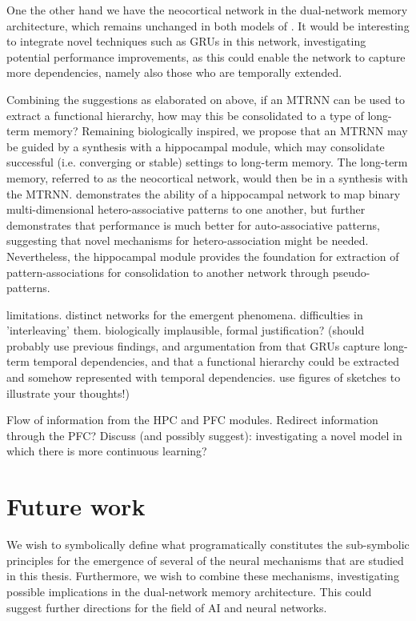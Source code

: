 One the other hand we have the neocortical network in the dual-network memory architecture, which remains unchanged in both models of \cite{Hattori2010, Hattori2014}. It would be interesting to integrate novel techniques such as GRUs in this network, investigating potential performance improvements, as this could enable the network to capture more dependencies, namely also those who are temporally extended.

Combining the suggestions as elaborated on above, if an MTRNN can be used to extract a functional hierarchy, how may this be consolidated to a type of long-term memory? Remaining biologically inspired, we propose that an MTRNN may be guided by a synthesis with a hippocampal module, which may consolidate successful (i.e. converging or stable) settings to long-term memory. The long-term memory, referred to as the neocortical network, would then be in a synthesis with the MTRNN.
\cite{Hattori2014} demonstrates the ability of a hippocampal network to map binary multi-dimensional hetero-associative patterns to one another, but further demonstrates that performance is much better for auto-associative patterns, suggesting that novel mechanisms for hetero-association might be needed. Nevertheless, the hippocampal module provides the foundation for extraction of pattern-associations for consolidation to another network through pseudo-patterns.

limitations. distinct networks for the emergent phenomena. difficulties in 'interleaving' them. biologically implausible, formal justification? (should probably use previous findings, and argumentation from that GRUs capture long-term temporal dependencies, and that a functional hierarchy could be extracted and somehow represented with temporal dependencies. use figures of sketches to illustrate your thoughts!)

Flow of information from the HPC and PFC modules. Redirect information through the PFC? Discuss (and possibly suggest): investigating a novel model in which there is more continuous learning?

\section{Future work}

We wish to symbolically define what programatically constitutes the sub-symbolic principles for the emergence of several of the neural mechanisms that are studied in this thesis. Furthermore, we wish to combine these mechanisms, investigating possible implications in the dual-network memory architecture. This could suggest further directions for the field of AI and neural networks.

